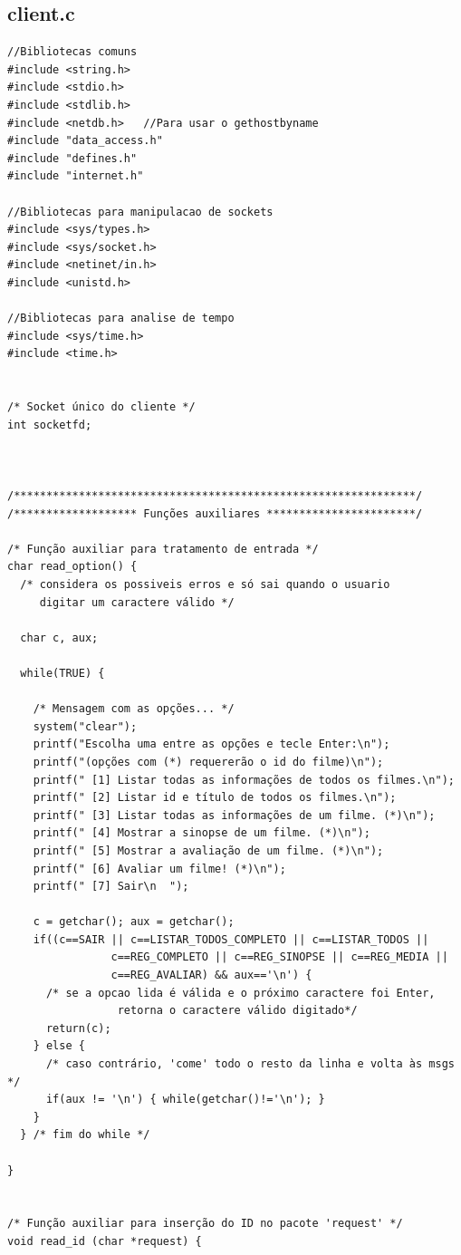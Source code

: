 \documentclass[11pt,twoside]{article}
\begin{document}
\subsection{client.c}
\begin{verbatim}
//Bibliotecas comuns
#include <string.h>
#include <stdio.h>
#include <stdlib.h>
#include <netdb.h>   //Para usar o gethostbyname
#include "data_access.h"
#include "defines.h"
#include "internet.h"

//Bibliotecas para manipulacao de sockets
#include <sys/types.h>
#include <sys/socket.h>
#include <netinet/in.h>
#include <unistd.h>

//Bibliotecas para analise de tempo
#include <sys/time.h>
#include <time.h>


/* Socket único do cliente */
int socketfd;



/**************************************************************/
/******************* Funções auxiliares ***********************/

/* Função auxiliar para tratamento de entrada */
char read_option() {
  /* considera os possiveis erros e só sai quando o usuario
     digitar um caractere válido */
  
  char c, aux;
  
  while(TRUE) {
    
    /* Mensagem com as opções... */
    system("clear");
    printf("Escolha uma entre as opções e tecle Enter:\n");
    printf("(opções com (*) requererão o id do filme)\n");
    printf(" [1] Listar todas as informações de todos os filmes.\n");
    printf(" [2] Listar id e título de todos os filmes.\n");
    printf(" [3] Listar todas as informações de um filme. (*)\n");
    printf(" [4] Mostrar a sinopse de um filme. (*)\n");
    printf(" [5] Mostrar a avaliação de um filme. (*)\n");
    printf(" [6] Avaliar um filme! (*)\n");
    printf(" [7] Sair\n  ");

    c = getchar(); aux = getchar();
    if((c==SAIR || c==LISTAR_TODOS_COMPLETO || c==LISTAR_TODOS ||
				c==REG_COMPLETO || c==REG_SINOPSE || c==REG_MEDIA ||
				c==REG_AVALIAR) && aux=='\n') {
      /* se a opcao lida é válida e o próximo caractere foi Enter, 
				 retorna o caractere válido digitado*/
      return(c);
    } else {
      /* caso contrário, 'come' todo o resto da linha e volta às msgs */
      if(aux != '\n') { while(getchar()!='\n'); }
    }
  } /* fim do while */

}


/* Função auxiliar para inserção do ID no pacote 'request' */
void read_id (char *request) {


\end{verbatim}
\end{document}
